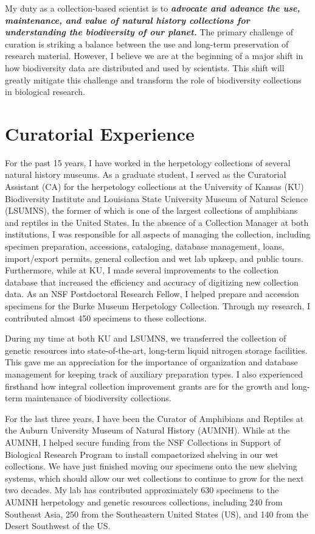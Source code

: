 \documentclass[10pt]{article}
\begin{document}
\raggedright
\singlespacing

My duty as a collection-based scientist is to \textbf{\textit{advocate and
advance the use, maintenance, and value of natural history collections for
understanding the biodiversity of our planet.}}
The primary challenge of curation is striking a balance between the use and
long-term preservation of research material.
However, I believe we are at the beginning of a major shift in how
biodiversity data are distributed and used by scientists.
This shift will greatly mitigate this challenge and transform the role of
biodiversity collections
in biological research.

\section*{Curatorial Experience}
For the past 15 years, I have worked in the herpetology collections
of several natural history museums.
As a graduate student,
I served as the Curatorial Assistant (CA) for the herpetology collections
at the University of Kansas (KU) Biodiversity Institute and Louisiana State
University Museum of Natural Science (LSUMNS), the former of which is one of
the largest collections of amphibians and reptiles in the United States.
In the absence of a Collection Manager at both institutions, I was responsible
for all aspects of managing the collection, including specimen preparation,
accessions, cataloging, database management, loans, import/export permits, 
general collection and wet lab upkeep, and public tours.
Furthermore, while at KU, I made several improvements to the collection
database that increased the efficiency and accuracy of digitizing new
collection data.
As an NSF Postdoctoral Research Fellow, I helped prepare and accession
specimens for the Burke Museum Herpetology Collection.
Through my research, I contributed almost 450 specimens to these collections.

During my time at both KU and LSUMNS, we transferred the collection of genetic
resources into state-of-the-art, long-term liquid nitrogen storage facilities.
This gave me an appreciation for the importance of organization and database
management for keeping track of auxiliary preparation types.
I also experienced firsthand how integral collection improvement grants are
for the growth and long-term maintenance of biodiversity collections.

For the last three years, I have been the Curator of Amphibians and Reptiles at
the Auburn University Museum of Natural History (AUMNH).
While at the AUMNH,
I helped secure funding from the NSF Collections in Support of Biological
Research Program to install compactorized shelving in our wet collections.
We have just finished moving our specimens onto the new shelving systems, which
should allow our wet collections to continue to grow for the next two decades.
My lab has contributed approximately 630 specimens to the AUMNH herpetology and
genetic resources collections, including
240 from Southeast Asia,
250 from the Southeastern United States (US),
and 140 from the Desert Southwest of the US.
\end{document}
